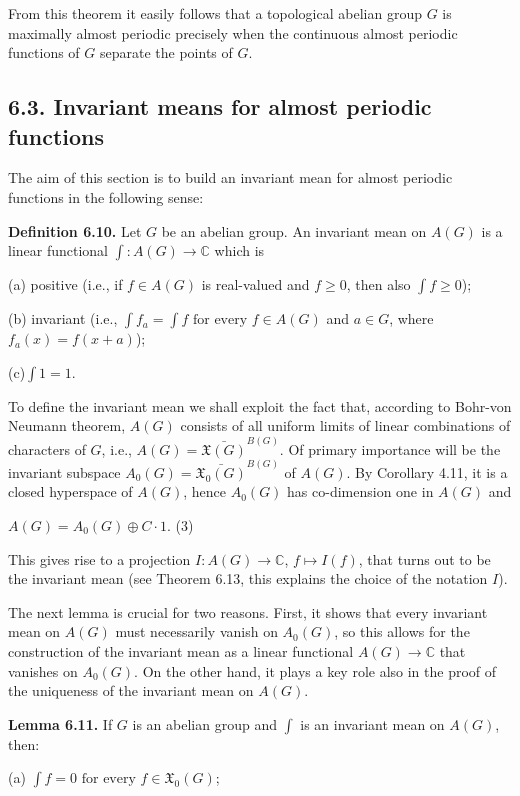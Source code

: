 \documentclass[12pt]{article}
\begin{document}
    From this theorem it easily follows that a topological abelian group $G$ is maximally almost periodic precisely when the
continuous almost periodic functions of $G$ separate the points of $G$.


\subsection{6.3. Invariant means for almost periodic functions}


    The aim of this section is to build an invariant mean for almost periodic functions in the following sense:


\textbf{Definition 6.10.} Let $G$ be an abelian group. An invariant mean on $A(G)$ is a linear functional $\int : A(G) \to \mathbb{C}$ which is


(a) positive (i.e., if $f \in A(G)$ is real-valued and $f \geqslant 0$, then also $\int f \geqslant 0$);


(b) invariant (i.e., $\int f_a = \int f \text{ for every } f \in A(G)$ and $a \in G$, where $f_a(x) = f (x + a)$);


(c)$\int 1 = 1$.


    To define the invariant mean we shall exploit the fact that, according to Bohr-von Neumann theorem, $A(G)$ consists of all
uniform limits of linear combinations of characters of $G$, i.e., $A(G) = \bar{\mathfrak{X}(G)}^{B(G)}$. Of primary importance will be the invariant
subspace $A_0(G) = \bar{\mathfrak{X}_0(G)}^{B(G)}$ of $A(G)$. By Corollary 4.11, it is a closed hyperspace of $A(G)$, hence $A_0 (G)$ has co-dimension
one in $A(G)$ and


    $A(G) = A_0(G) \oplus C \cdot 1$. (3)


    This gives rise to a projection $I : A(G) \to \mathbb{C}$, $f \mapsto I(f )$, that turns out to be the invariant mean (see Theorem 6.13, this
explains the choice of the notation $I$).


    The next lemma is crucial for two reasons. First, it shows that every invariant mean on $A(G)$ must necessarily vanish
on $A_0(G)$, so this allows for the construction of the invariant mean as a linear functional $A(G) \to \mathbb{C}$ that vanishes on $A_0(G)$.
On the other hand, it plays a key role also in the proof of the uniqueness of the invariant mean on $A(G)$.


\textbf{Lemma 6.11.} If $G$ is an abelian group and $\int$ is an invariant mean on $A(G)$, then:


(a) $\int f = 0 \text{ for every } f \in \mathfrak{X}_0(G)$;
\end{document}
